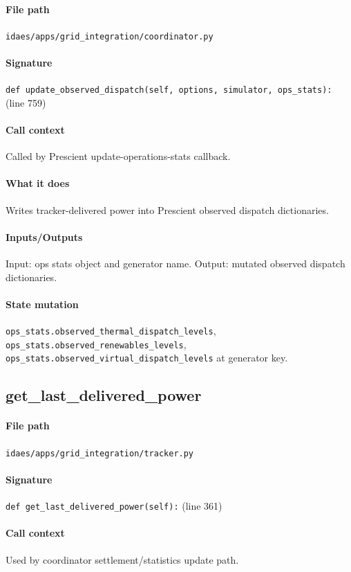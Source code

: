 \documentclass{article}
\begin{document}
\paragraph{File path} \texttt{idaes/apps/grid\_integration/coordinator.py}
\paragraph{Signature} \texttt{def update\_observed\_dispatch(self, options, simulator, ops\_stats):} (line 759)
\paragraph{Call context} Called by Prescient update-operations-stats callback.
\paragraph{What it does} Writes tracker-delivered power into Prescient observed dispatch dictionaries.
\paragraph{Inputs/Outputs} Input: ops stats object and generator name. Output: mutated observed dispatch dictionaries.
\paragraph{State mutation} \texttt{ops\_stats.observed\_thermal\_dispatch\_levels}, \texttt{ops\_stats.observed\_renewables\_levels}, \texttt{ops\_stats.observed\_virtual\_dispatch\_levels} at generator key.

\subsection{get\_last\_delivered\_power}\label{fn:get_last_delivered_power}
\paragraph{File path} \texttt{idaes/apps/grid\_integration/tracker.py}
\paragraph{Signature} \texttt{def get\_last\_delivered\_power(self):} (line 361)
\paragraph{Call context} Used by coordinator settlement/statistics update path.
\end{document}
